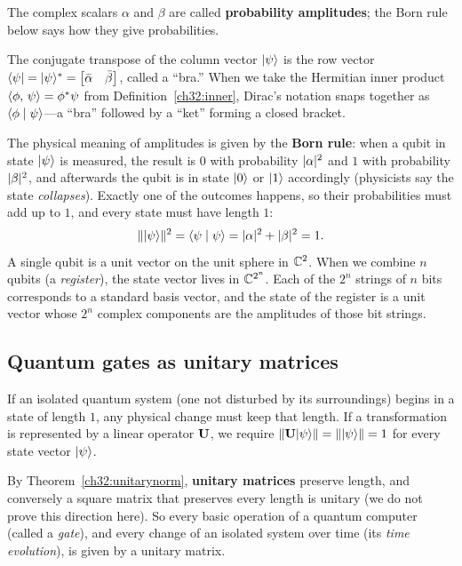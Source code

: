 The complex scalars $\alpha$ and $\beta$ are called \textbf{probability
amplitudes}; the Born rule below says how they give probabilities.

The conjugate transpose of the column vector $\lvert \psi \rangle$ is the row vector
$\langle \psi \rvert = \lvert \psi \rangle^* = \begin{bmatrix}\bar\alpha & \bar\beta\end{bmatrix}$,
called a ``bra.'' When we take the Hermitian inner product
$\langle \phi,\, \psi \rangle = \mathbf{\phi}^*\mathbf{\psi}$ from Definition~\ref{ch32:inner}, Dirac's
notation snaps together as $\langle \phi \mid \psi \rangle$---a ``bra'' followed by a
``ket'' forming a closed bracket.

The physical meaning of amplitudes is given by the \textbf{Born rule}: when a
qubit in state $\lvert \psi \rangle$ is measured, the result is $0$ with probability
$\lvert\alpha\rvert^2$ and $1$ with probability $\lvert\beta\rvert^2$, and afterwards the qubit
is in state $\lvert 0 \rangle$ or $\lvert 1 \rangle$ accordingly (physicists say the state
\emph{collapses}). Exactly one of the outcomes happens, so their probabilities
must add up to $1$, and every state must have length $1$:
\[
  \lVert\lvert \psi \rangle\rVert^2 = \langle \psi \mid \psi \rangle = \lvert\alpha\rvert^2 + \lvert\beta\rvert^2 = 1.
\]
A single qubit is a unit vector on the unit sphere in $\mathbb{C}^2$. When we combine
$n$ qubits (a \emph{register}), the state vector lives in $\mathbb{C}^{2^n}$. Each of the
$2^n$ strings of $n$ bits corresponds to a standard basis vector, and the state
of the register is a unit vector whose $2^n$ complex components are the
amplitudes of those bit strings.

\subsection{Quantum gates as unitary matrices}

If an isolated quantum system (one not disturbed by its surroundings) begins in a
state of length $1$, any physical change must keep that length. If a transformation is represented by
a linear operator $\mathbf{U}$, we require
$\lVert\mathbf{U}\lvert \psi \rangle\rVert = \lVert\lvert \psi \rangle\rVert = 1$ for every state vector
$\lvert \psi \rangle$.

By Theorem~\ref{ch32:unitarynorm}, \textbf{unitary matrices} preserve length, and
conversely a square matrix that preserves every length is unitary (we do not prove
this direction here). So every basic operation of a quantum computer (called a
\emph{gate}), and every change of an isolated system over time (its \emph{time
evolution}), is given by a unitary matrix.

